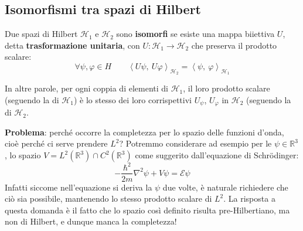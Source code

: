 \documentclass[FisicaTeorica.tex]{subfiles}
\begin{document}
\subsection{Isomorfismi tra spazi di Hilbert}
\begin{dfn}
Due spazi di Hilbert $\mathcal{H}_1$ e $\mathcal{H}_2$ sono \textbf{isomorfi} se esiste una mappa biiettiva $U$, detta \textbf{trasformazione unitaria}, con $U:\mathcal{H}_1\rightarrow\mathcal{H}_2$ che preserva il prodotto scalare:
\[
	\forall \psi, \varphi \in H \qquad \left\langle U\psi,\ U\varphi\right\rangle_{\mathcal{H}_2}=\left\langle\psi,\ \varphi\right\rangle_{\mathcal{H}_1}
\]
\end{dfn}
In altre parole, per ogni coppia di elementi di $\mathcal{H}_1$, il loro prodotto scalare (seguendo la  di $\mathcal{H}_1$) è lo stesso dei loro corrispettivi $U_\psi$, $U_\varphi$ in $\mathcal{H}_2$ (seguendo la  di $\mathcal{H}_2$.

\textbf{Problema}: perché occorre la completezza per lo spazio delle funzioni d'onda, cioè perché ci serve prendere $L^2$? Potremmo considerare ad esempio per le $\psi\in\mathbb{R}^3$, lo spazio $V=L^2\left(\mathbb{R}^3\right)\cap C^2(\mathbb{R}^3)$ come suggerito dall'equazione di Schrödinger:
\[
	-\frac{\hbar^2}{2m} \nabla^2 \psi+V\psi=\mathcal{E}\psi
\]
Infatti siccome nell'equazione si deriva la $\psi$ due volte, è naturale richiedere che ciò sia possibile, mantenendo lo stesso prodotto scalare di $L^2$. La risposta a questa domanda è il fatto che lo spazio così definito risulta pre-Hilbertiano, ma non di Hilbert, e dunque manca la completezza!\\
\end{document}
